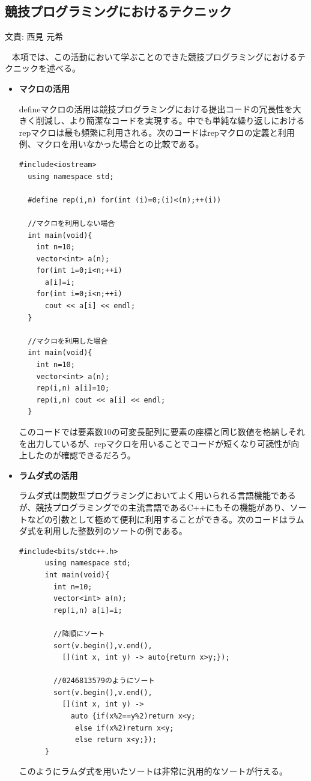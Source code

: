 \documentclass[11pt,a4paper]{jsarticle}
\newcommand{\writtenBy}[1]{\begin{flushright}文責: #1\end{flushright}~}
\begin{document}
\subsection{競技プログラミングにおけるテクニック}
\writtenBy{西見 元希}
%
本項では、この活動において学ぶことのできた競技プログラミングにおけるテクニックを述べる。
%
\begin{itemize}
    \item{\bf マクロの活用}
      \par
      defineマクロの活用は競技プログラミングにおける提出コードの冗長性を大きく削減し、より簡潔なコードを実現する。中でも単純な繰り返しにおけるrepマクロは最も頻繁に利用される。次のコードはrepマクロの定義と利用例、マクロを用いなかった場合との比較である。

  
%
  \begin{lstlisting}[caption=repマクロの例,label=fuga]
  #include<iostream>
  using namespace std;
 
  #define rep(i,n) for(int (i)=0;(i)<(n);++(i))
  
  //マクロを利用しない場合
  int main(void){
    int n=10;
    vector<int> a(n);
    for(int i=0;i<n;++i)
      a[i]=i;
    for(int i=0;i<n;++i)
      cout << a[i] << endl;
  }

  //マクロを利用した場合
  int main(void){
    int n=10;
    vector<int> a(n);
    rep(i,n) a[i]=10;
    rep(i,n) cout << a[i] << endl;
  }
  \end{lstlisting}
  このコードでは要素数10の可変長配列に要素の座標と同じ数値を格納しそれを出力しているが、repマクロを用いることでコードが短くなり可読性が向上したのが確認できるだろう。
      \par
    \item{\bf ラムダ式の活用}
      \par
      ラムダ式は関数型プログラミングにおいてよく用いられる言語機能であるが、競技プログラミングでの主流言語であるC++にもその機能があり、ソートなどの引数として極めて便利に利用することができる。次のコードはラムダ式を利用した整数列のソートの例である。
      \begin{lstlisting}[caption=lambda式の例]
      #include<bits/stdc++.h>
      using namespace std;
      int main(void){
        int n=10;
        vector<int> a(n);
        rep(i,n) a[i]=i;

        //降順にソート
        sort(v.begin(),v.end(),
          [](int x, int y) -> auto{return x>y;});

        //0246813579のようにソート
        sort(v.begin(),v.end(),
          [](int x, int y) ->
            auto {if(x%2==y%2)return x<y;
             else if(x%2)return x<y;
             else return x<y;});
      }
      \end{lstlisting}
      このようにラムダ式を用いたソートは非常に汎用的なソートが行える。
      \par

\end{itemize}
\end{document}
